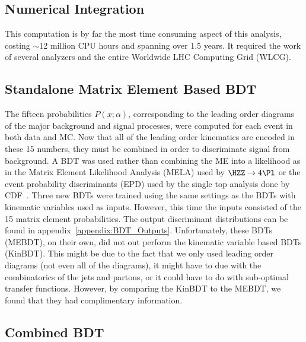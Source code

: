 \subsection{Numerical Integration}


This computation is by far the most time consuming aspect of this analysis, costing $\sim$12 million CPU hours and spanning over 1.5 years.
It required the work of several analyzers and the entire Worldwide LHC Computing Grid (WLCG).

\subsection{Standalone Matrix Element Based BDT}

The fifteen probabilities $P(x;\alpha)$, corresponding to the leading order diagrams of the major background and signal processes, were computed for each event in both data and MC.
Now that all of the leading order kinematics are encoded in these 15 numbers, they must be combined in order to discriminate signal from background.
A BDT was used rather than combining the ME into a likelihood as in the Matrix Element Likelihood Analysis (MELA) used by $\HZZ\rightarrow\text{4}\Pl$ or the event probability discriminants (EPD) used by the single top analysis done by CDF~\cite{Dong2008}.
Three new BDTs were trained using the same settings as the BDTs with kinematic variables used as inputs.
However, this time the inputs consisted of the 15 matrix element probabilities.
The output discriminant distributions can be found in appendix~\ref{appendix:BDT_Outputs}.
Unfortunately, these BDTs (MEBDT), on their own, did not out perform the kinematic variable based BDTs (KinBDT).
This might be due to the fact that we only used leading order diagrams (not even all of the diagrams), it might have to due with the combinatorics of the jets and partons, or it could have to do with sub-optimal transfer functions.
However, by comparing the KinBDT to the MEBDT, we found that they had complimentary information.

\subsection{Combined BDT}

